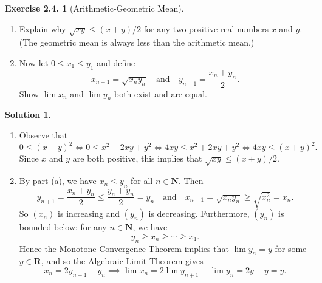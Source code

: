 \documentclass[12pt]{article}
\theoremstyle{definition}
\theoremstyle{exercise}
\newtheorem{exercise}{Exercise 2.4.}
\theoremstyle{solution}
\newtheorem*{solution}{Solution}
\newcommand{\N}{\mathbf{N}}
\newcommand{\R}{\mathbf{R}}
\begin{document}
\begin{exercise}[Arithmetic-Geometric Mean]
\label{ex:6}
    \begin{enumerate}
        \item Explain why \( \sqrt{xy} \leq (x + y)/2 \) for any two positive real numbers \( x \) and \( y \). (The geometric mean is always less than the arithmetic mean.)

        \item Now let \( 0 \leq x_1 \leq y_1 \) and define
        \[
            x_{n+1} = \sqrt{x_n y_n} \quad \text{and} \quad y_{n+1} = \frac{x_n + y_n}{2}.
        \]
        Show \( \lim x_n \) and \( \lim y_n \) both exist and are equal.
    \end{enumerate}
\end{exercise}

\begin{solution}
    \begin{enumerate}
        \item Observe that
        \[
            0 \leq (x - y)^2 \iff 0 \leq x^2 - 2xy + y^2 \iff 4xy \leq x^2 + 2xy + y^2 \iff 4xy \leq (x + y)^2.
        \]
        Since \( x \) and \( y \) are both positive, this implies that \( \sqrt{xy} \leq (x + y)/2 \).

        \item By part (a), we have \( x_n \leq y_n \) for all \( n \in \N \). Then
        \[
            y_{n+1} = \frac{x_n + y_n}{2} \leq \frac{y_n + y_n}{2} = y_n \quad \text{and} \quad x_{n+1} = \sqrt{x_n y_n} \geq \sqrt{x_n^2} = x_n.
        \]
        So \( (x_n) \) is increasing and \( (y_n) \) is decreasing. Furthermore, \( (y_n) \) is bounded below: for any \( n \in \N \), we have
        \[
            y_n \geq x_n \geq \cdots \geq x_1.
        \]
        Hence the Monotone Convergence Theorem implies that \( \lim y_n = y \) for some \( y \in \R \), and so the Algebraic Limit Theorem gives
        \[
            x_n = 2 y_{n+1} - y_n \implies \lim x_n = 2 \lim y_{n+1} - \lim y_n = 2 y - y = y.
        \]
    \end{enumerate}
\end{solution}
\end{document}
